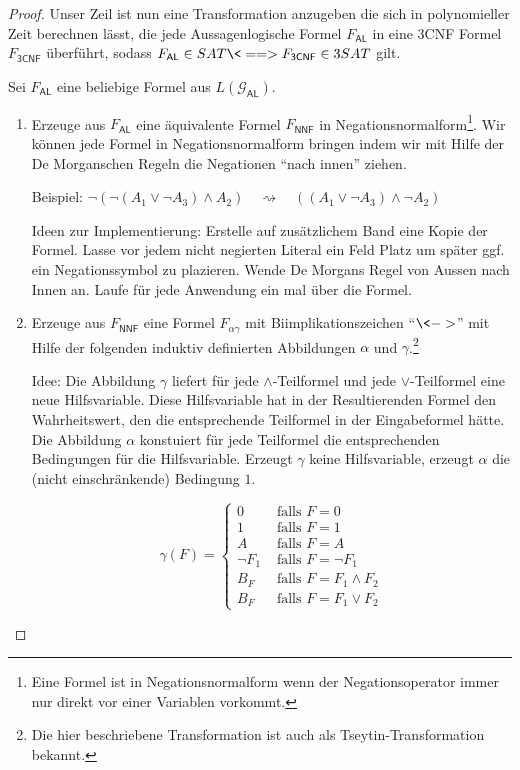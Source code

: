 \begin{proof}
Unser Zeil ist nun eine Transformation anzugeben die sich in polynomieller Zeit berechnen lässt, die jede Aussagenlogische Formel $F_\mathsf{AL}$ in eine 3CNF Formel $F_\mathsf{3CNF}$ überführt, sodass 
$F_\mathsf{AL}\in SAT \<==> F_\mathsf{3CNF}\in 3SAT$
gilt.

Sei $F_\mathsf{AL}$ eine beliebige Formel aus $L(\mathcal{G}_\mathsf{AL})$.

\begin{enumerate}
 \item Erzeuge aus $F_\mathsf{AL}$ eine äquivalente Formel $F_\mathsf{NNF}$ in Negationsnormalform\footnote{Eine Formel ist in Negationsnormalform wenn der Negationsoperator immer nur direkt vor einer Variablen vorkommt.}.
 Wir können jede Formel in Negationsnormalform bringen indem wir mit Hilfe der De Morganschen Regeln die Negationen ``nach innen'' ziehen.
 
 Beispiel: $\neg(\neg (A_1\lor \neg A_3)\land A_2) \quad\rightsquigarrow\quad ((A_1\lor \neg A_3)\land \neg A_2)$
 
 Ideen zur Implementierung: Erstelle auf zusätzlichem Band eine Kopie der Formel. 
 Lasse vor jedem nicht negierten Literal ein Feld Platz um später ggf. ein Negationssymbol zu plazieren.
 Wende De Morgans Regel von Aussen nach Innen an.
 Laufe für jede Anwendung ein mal über die Formel.
 
 
 \item Erzeuge aus $F_\mathsf{NNF}$ eine Formel $F_{\alpha\gamma}$ mit Biimplikationszeichen ``$\<->$'' mit Hilfe der folgenden induktiv definierten Abbildungen $\alpha$ und $\gamma$.\footnote{
 Die hier beschriebene Transformation ist auch als Tseytin-Transformation bekannt.}
 
 Idee: Die Abbildung $\gamma$ liefert für jede $\land$-Teilformel und jede $\lor$-Teilformel eine neue Hilfsvariable.
 Diese Hilfsvariable hat in der Resultierenden Formel den Wahrheitswert, den die entsprechende Teilformel in der Eingabeformel hätte.
 Die Abbildung $\alpha$ konstuiert für jede Teilformel die entsprechenden Bedingungen für die Hilfsvariable.
 Erzeugt $\gamma$ keine Hilfsvariable, erzeugt $\alpha$ die (nicht einschränkende) Bedingung $1$.
 
 $$\gamma(F)=
 \begin{cases}
   0 & \text{ falls } F=0\\
   1 & \text{ falls } F=1\\
   A & \text{ falls } F=A\\
   \neg F_1 & \text{ falls } F=\neg F_1\\
   B_F & \text{ falls } F=F_1\land F_2\\
   B_F & \text{ falls } F=F_1\lor F_2
  \end{cases}$$
 

\end{enumerate}
\end{proof}
